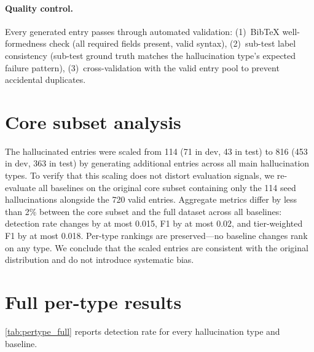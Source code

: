 \paragraph{Quality control.}
Every generated entry passes through automated validation:
(1)~BibTeX well-formedness check (all required fields present, valid syntax),
(2)~sub-test label consistency (sub-test ground truth matches the hallucination type's expected failure pattern),
(3)~cross-validation with the valid entry pool to prevent accidental duplicates.

\section{Core subset analysis}
\label{app:core-subset}

The hallucinated entries were scaled from 114 (71 in dev, 43 in test) to 816 (453 in dev, 363 in test) by generating additional entries across all main hallucination types.
To verify that this scaling does not distort evaluation signals, we re-evaluate all baselines on the original core subset containing only the 114 seed hallucinations alongside the 720 valid entries.
Aggregate metrics differ by less than 2\% between the core subset and the full dataset across all baselines: detection rate changes by at most 0.015, F1 by at most 0.02, and tier-weighted F1 by at most 0.018.
Per-type rankings are preserved---no baseline changes rank on any type.
We conclude that the scaled entries are consistent with the original distribution and do not introduce systematic bias.

\section{Full per-type results}
\label{app:pertype}

\cref{tab:pertype_full} reports detection rate for every hallucination type and baseline.

